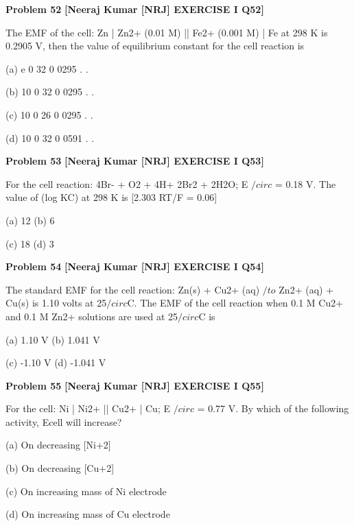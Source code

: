 \begin{problembox}
\textbf{Problem 52} \hfill \textbf{[Neeraj Kumar [NRJ] EXERCISE I Q52]}
\label{q:ext-nrj_all_questions-52}

The EMF of the cell: Zn | Zn2+ (0.01 M) || Fe2+ 
(0.001 M) | Fe at 298 K is 0.2905 V, then the value 
of equilibrium constant for the cell reaction is
 
 (a) e
0 32
0 0295
.
.
 
(b) 10
0 32
0 0295
.
.
 
 (c) 10
0 26
0 0295
.
.
 
(d) 10
0 32
0 0591
.
.
\end{problembox}

\begin{problembox}
\textbf{Problem 53} \hfill \textbf{[Neeraj Kumar [NRJ] EXERCISE I Q53]}
\label{q:ext-nrj_all_questions-53}

For the cell reaction: 4Br- + O2 + 4H+   2Br2 + 
2H2O; E $/circ$ = 0.18 V. The value of (log KC) at 298 K 
is [2.303 RT/F = 0.06]
 
 (a) 12 
(b) 6
 
 (c) 18 
(d) 3
\end{problembox}

\begin{problembox}
\textbf{Problem 54} \hfill \textbf{[Neeraj Kumar [NRJ] EXERCISE I Q54]}
\label{q:ext-nrj_all_questions-54}

The standard EMF for the cell reaction: Zn(s) + 
Cu2+ (aq) $/to$ Zn2+ (aq) + Cu(s) is 1.10 volts at 25$/circ$C. 
The EMF of the cell reaction when 0.1 M Cu2+ 
and 0.1 M Zn2+ solutions are used at 25$/circ$C is
 
 (a) 1.10 V 
(b) 1.041 V
 
 (c) -1.10 V 
(d) -1.041 V
\end{problembox}

\begin{problembox}
\textbf{Problem 55} \hfill \textbf{[Neeraj Kumar [NRJ] EXERCISE I Q55]}
\label{q:ext-nrj_all_questions-55}

For the cell: Ni | Ni2+ || Cu2+ | Cu; E $/circ$ = 0.77 V. By 
which of the following activity, Ecell will increase?
 
 (a) On decreasing [Ni+2]
 
 (b) On decreasing [Cu+2]
 
 (c) On increasing mass of Ni electrode
 
 (d) On increasing mass of Cu electrode
\end{problembox}

